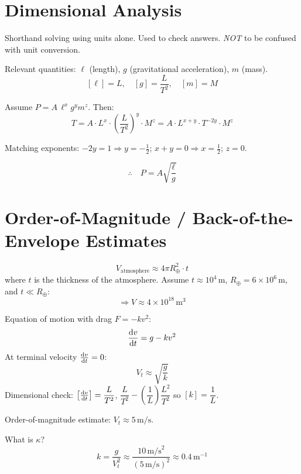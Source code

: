 \section{Dimensional Analysis}

\begin{definition}
Shorthand solving using units alone. Used to check answers. \emph{NOT} to be confused with unit conversion.
\end{definition}

\begin{example}
Relevant quantities: $\ell$ (length), $g$ (gravitational acceleration), $m$ (mass).
\[
[\ell] = L, \quad [g] = \frac{L}{T^2}, \quad [m] = M
\]

Assume $P = A\,\ell^x g^y m^z$. Then:
\[
T = A \cdot L^x \cdot \left(\frac{L}{T^2}\right)^y \cdot M^z = A\cdot L^{x+y} \cdot T^{-2y} \cdot M^z
\]

Matching exponents: $-2y = 1 \Rightarrow y = -\tfrac{1}{2}$; $x + y = 0 \Rightarrow x = \tfrac{1}{2}$; $z = 0$.

\[
\therefore\quad P = A\sqrt{\frac{\ell}{g}}
\]
\end{example}

\section{Order-of-Magnitude / Back-of-the-Envelope Estimates}

\begin{example}
\[
V_{\text{atmosphere}} \approx 4\pi R_\oplus^2 \cdot t
\]
where $t$ is the thickness of the atmosphere. Assume $t \approx 10^4\,\mathrm{m}$, $R_\oplus = 6\times 10^6\,\mathrm{m}$, and $t \ll R_\oplus$:
\[
\Rightarrow V \approx \boxed{4\times 10^{18}\,\mathrm{m}^3}
\]
\end{example}

\begin{example}
Equation of motion with drag $F = -kv^2$:
\[
\dv{v}{t} = g - kv^2
\]
At terminal velocity $\dv{v}{t} = 0$:
\[
V_t \approx \sqrt{\frac{g}{k}}
\]
Dimensional check: $\left[\dv{v}{t}\right] = \dfrac{L}{T^2}$, $\dfrac{L}{T^2} - \left(\dfrac{1}{L}\right)\dfrac{L^2}{T^2}$ so $[k] = \dfrac{1}{L}$.

Order-of-magnitude estimate: $V_t \approx 5\,\mathrm{m/s}$.

What is $\kappa$?
\[
k = \frac{g}{V_t^2} \approx \frac{10\,\mathrm{m/s}^2}{(5\,\mathrm{m/s})^2} \approx 0.4\,\mathrm{m}^{-1}
\]
\end{example}

